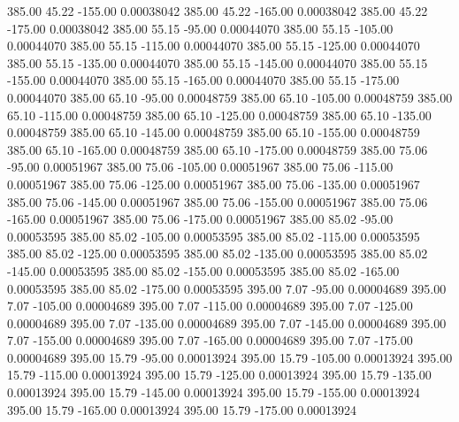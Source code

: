     385.00     45.22   -155.00     0.00038042
    385.00     45.22   -165.00     0.00038042
    385.00     45.22   -175.00     0.00038042
    385.00     55.15    -95.00     0.00044070
    385.00     55.15   -105.00     0.00044070
    385.00     55.15   -115.00     0.00044070
    385.00     55.15   -125.00     0.00044070
    385.00     55.15   -135.00     0.00044070
    385.00     55.15   -145.00     0.00044070
    385.00     55.15   -155.00     0.00044070
    385.00     55.15   -165.00     0.00044070
    385.00     55.15   -175.00     0.00044070
    385.00     65.10    -95.00     0.00048759
    385.00     65.10   -105.00     0.00048759
    385.00     65.10   -115.00     0.00048759
    385.00     65.10   -125.00     0.00048759
    385.00     65.10   -135.00     0.00048759
    385.00     65.10   -145.00     0.00048759
    385.00     65.10   -155.00     0.00048759
    385.00     65.10   -165.00     0.00048759
    385.00     65.10   -175.00     0.00048759
    385.00     75.06    -95.00     0.00051967
    385.00     75.06   -105.00     0.00051967
    385.00     75.06   -115.00     0.00051967
    385.00     75.06   -125.00     0.00051967
    385.00     75.06   -135.00     0.00051967
    385.00     75.06   -145.00     0.00051967
    385.00     75.06   -155.00     0.00051967
    385.00     75.06   -165.00     0.00051967
    385.00     75.06   -175.00     0.00051967
    385.00     85.02    -95.00     0.00053595
    385.00     85.02   -105.00     0.00053595
    385.00     85.02   -115.00     0.00053595
    385.00     85.02   -125.00     0.00053595
    385.00     85.02   -135.00     0.00053595
    385.00     85.02   -145.00     0.00053595
    385.00     85.02   -155.00     0.00053595
    385.00     85.02   -165.00     0.00053595
    385.00     85.02   -175.00     0.00053595
    395.00      7.07    -95.00     0.00004689
    395.00      7.07   -105.00     0.00004689
    395.00      7.07   -115.00     0.00004689
    395.00      7.07   -125.00     0.00004689
    395.00      7.07   -135.00     0.00004689
    395.00      7.07   -145.00     0.00004689
    395.00      7.07   -155.00     0.00004689
    395.00      7.07   -165.00     0.00004689
    395.00      7.07   -175.00     0.00004689
    395.00     15.79    -95.00     0.00013924
    395.00     15.79   -105.00     0.00013924
    395.00     15.79   -115.00     0.00013924
    395.00     15.79   -125.00     0.00013924
    395.00     15.79   -135.00     0.00013924
    395.00     15.79   -145.00     0.00013924
    395.00     15.79   -155.00     0.00013924
    395.00     15.79   -165.00     0.00013924
    395.00     15.79   -175.00     0.00013924
